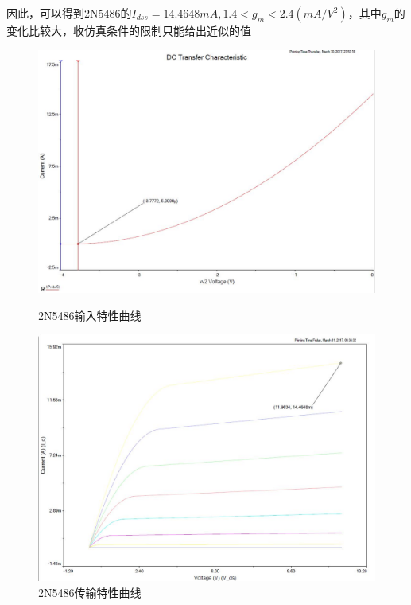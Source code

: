 \documentclass[UTF8,a4paper]{ctexart}
\begin{document}
因此，可以得到2N5486的$I_{dss}=14.4648mA,1.4<g_m<2.4(mA/V^2)$，其中$g_m$的变化比较大，收仿真条件的限制只能给出近似的值
\begin{figure}
\centering 
\includegraphics[width=\textwidth]{ugsoff.jpg}
\caption{2N5486输入特性曲线}
\label{in}
\includegraphics[width=\textwidth]{ids.jpg}
\caption{2N5486传输特性曲线}
\label{transfer}
\end{figure}
\end{document}
